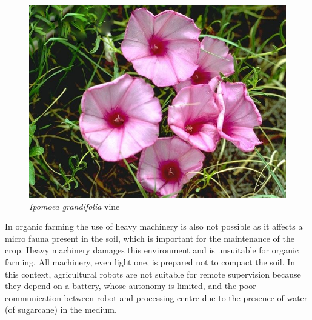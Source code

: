 \documentclass[
    12pt,                       %
    oneside,                    %
    a4paper,                    %
    brazil,                     %
    french,                     %
    spanish,                    %
    english,                    %
    ]{abntex2}
\begin{document}
\begin{figure}[htb]
  \caption{\label{fig:ipomoea}\textit{Ipomoea grandifolia} vine}
  \begin{center}
    \includegraphics[scale=0.5]{images/Ipomoea_grandifolia76.jpg}
  \end{center}
\end{figure}



  In organic farming the use of heavy machinery is also not possible as it affects a micro fauna present in the soil, which is important for the maintenance of the crop. Heavy machinery damages this environment and is unsuitable for organic farming. All machinery, even light one, is prepared not to compact the soil. In this context, agricultural robots are not suitable for remote supervision because they depend on a battery, whose autonomy is limited, and the poor communication between robot and processing centre due to the presence of water (of sugarcane) in the medium.
\end{document}
